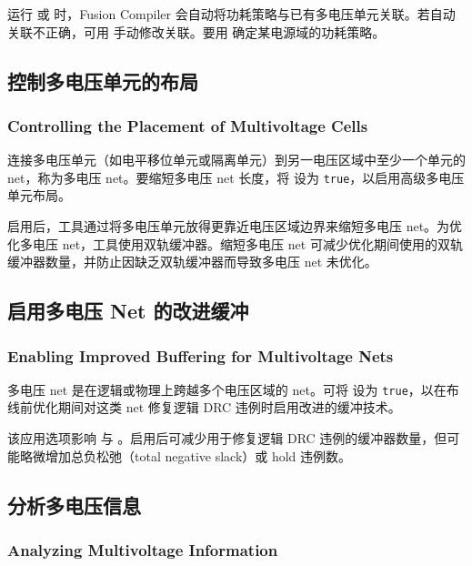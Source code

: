 运行  或  时，Fusion Compiler 会自动将功耗策略与已有多电压单元关联。若自动关联不正确，可用  手动修改关联。要用  确定某电源域的功耗策略。

\subsection{控制多电压单元的布局}
\subsubsection*{Controlling the Placement of Multivoltage Cells}

连接多电压单元（如电平移位单元或隔离单元）到另一电压区域中至少一个单元的 net，称为多电压 net。要缩短多电压 net 长度，将  设为 \texttt{true}，以启用高级多电压单元布局。

启用后，工具通过将多电压单元放得更靠近电压区域边界来缩短多电压 net。为优化多电压 net，工具使用双轨缓冲器。缩短多电压 net 可减少优化期间使用的双轨缓冲器数量，并防止因缺乏双轨缓冲器而导致多电压 net 未优化。

\subsection{启用多电压 Net 的改进缓冲}
\subsubsection*{Enabling Improved Buffering for Multivoltage Nets}

多电压 net 是在逻辑或物理上跨越多个电压区域的 net。可将  设为 \texttt{true}，以在布线前优化期间对这类 net 修复逻辑 DRC 违例时启用改进的缓冲技术。

该应用选项影响  与 。启用后可减少用于修复逻辑 DRC 违例的缓冲器数量，但可能略微增加总负松弛（total negative slack）或 hold 违例数。

\subsection{分析多电压信息}
\subsubsection*{Analyzing Multivoltage Information}

